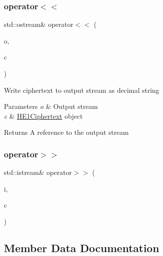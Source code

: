 \subsubsection{\texorpdfstring{operator$<$$<$}{operator<<}}
{\footnotesize\ttfamily std\+::ostream\& operator$<$$<$ (\begin{DoxyParamCaption}\item[{std\+::ostream \&}]{o,  }\item[{const \hyperlink{classHE1Ciphertext}{H\+E1\+Ciphertext} \&}]{c }\end{DoxyParamCaption})\hspace{0.3cm}{\ttfamily [friend]}}

Write {\ttfamily ciphertext} to output stream as decimal string 
\begin{DoxyParams}{Parameters}
{\em o} & Output stream \\
\hline
{\em c} & {\ttfamily \hyperlink{classHE1Ciphertext}{H\+E1\+Ciphertext}} object \\
\hline
\end{DoxyParams}
\begin{DoxyReturn}{Returns}
A reference to the output stream 
\end{DoxyReturn}
\mbox{\label{classHE1Ciphertext_a1e2c0400cdd3fca5fcd4946f9b053b8c}} 
\subsubsection{\texorpdfstring{operator$>$$>$}{operator>>}}
{\footnotesize\ttfamily std\+::istream\& operator$>$$>$ (\begin{DoxyParamCaption}\item[{std\+::istream \&}]{i,  }\item[{const \hyperlink{classHE1Ciphertext}{H\+E1\+Ciphertext} \&}]{c }\end{DoxyParamCaption})\hspace{0.3cm}{\ttfamily [friend]}}



\subsection{Member Data Documentation}
\mbox{\label{classHE1Ciphertext_a924bd87bcc91518945bc039f10a20a48}} 
